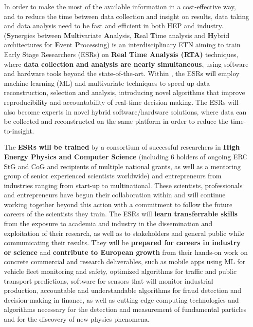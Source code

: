 In order to make the most of the available information in a cost-effective way, and to reduce the time between data collection and  insight on results, data taking and data analysis need to be fast and efficient in both HEP and industry. 
\acronym ({\color{blue}\textbf{S}}ynergies between {\color{blue}\textbf{M}}ultivariate {\color{blue}\textbf{A}}nalysis, {\color{blue}\textbf{R}}eal {\color{blue}\textbf{T}}ime analysis and {\color{blue}\textbf{H}}ybrid architectures for {\color{blue}\textbf{E}}vent {\color{blue}\textbf{P}}rocessing) is an interdisciplinary ETN aiming to train Early Stage Researchers (ESRs) on \textbf{Real Time Analysis (RTA)} techniques, where \textbf{data collection and analysis are nearly simultaneous}, using software and hardware tools beyond the state-of-the-art. 
Within \acronym, the ESRs will employ machine learning (ML) and multivariate techniques to speed up data reconstruction, selection and analysis, introducing novel algorithms that improve reproducibility and accountability of real-time decision making. 
The ESRs will also become experts in novel hybrid software/hardware solutions, where data can be collected and reconstructed on the same platform in order to reduce the time-to-insight.

The \acronym \textbf{ESRs will be trained} by a consortium of successful researchers in \textbf{High Energy Physics and Computer Science} (including 6 holders of ongoing ERC StG and CoG and recipients of multiple national grants, as well as a mentoring group of senior experienced scientists worldwide) and entrepreneurs from industries ranging from start-up to multinational. 
These scientists, professionals and entrepreneurs have begun their collaboration within \acronym and will continue working together beyond this action with a commitment to follow the future careers of the scientists they train. 
The ESRs will \textbf{learn transferrable skills} from the exposure to academia and industry in the dissemination and exploitation of their research, as well as to stakeholders and general public while communicating their results. 
They will be \textbf{prepared for careers in industry or science} and \textbf{contribute to European growth} from their hands-on work on concrete commercial and research deliverables, such as 
mobile apps using ML for vehicle fleet monitoring and safety, 
optimized algorithms for traffic and public transport predictions,
software for sensors that will monitor industrial production, 
accountable and understandable algorithms for fraud detection and decision-making in finance,
as well as cutting edge computing technologies and algorithms necessary for the detection and measurement of fundamental particles and for the discovery of new physics phenomena. 
